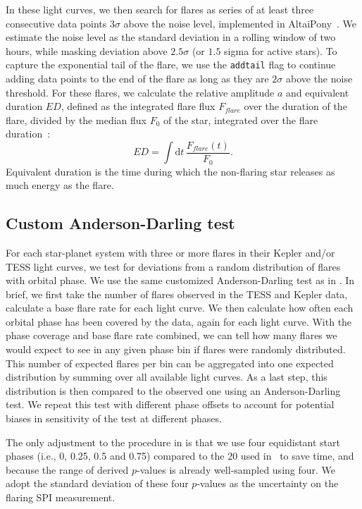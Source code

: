 \documentclass[twocolumn]{aastex631}
\begin{document}
In these light curves, we then search for flares as series of at least three consecutive data points $3\sigma$ above the noise level, implemented in AltaiPony~\cite{ilin2021altaipony}. We estimate the noise
level as the standard deviation in a rolling window of two hours, while masking deviation above $2.5\sigma$ (or $1.5$ sigma for active stars). To capture the exponential tail of the flare, we use the \texttt{addtail} flag to continue adding data points to the end of the flare as long as they are $2\sigma$ above the noise threshold. For these flares, we calculate the relative amplitude $a$ and equivalent duration $ED$, defined as the integrated flare flux $F_{flare}$ over the duration of the flare, divided by the median flux $F_0$ of the star, integrated over the flare duration~\citep{gershberg1972results}:
\begin{equation}
\label{eq:ED}
ED=\displaystyle \int \mathrm dt\, \frac{F_{flare}(t)}{F_0}.
\end{equation}
Equivalent duration is the time during which the non-flaring star releases as much energy as the flare.


\subsection{Custom Anderson-Darling test}
\label{methods:adtest}
For each star-planet system with three or more flares in their Kepler and/or TESS light curves, we test for deviations from a random distribution of flares with orbital phase. We use the same customized Anderson-Darling test as in \cite{ilin2022searching}. In brief, we first take the number of flares observed in the TESS and Kepler data, calculate a base flare rate for each light curve. We then calculate how often each orbital phase has been covered by the data, again for each light curve. With the phase coverage and base flare rate combined, we can tell how many flares we would expect to see in any given phase bin if flares were randomly distributed. This number of expected flares per bin can be aggregated into one expected distribution by summing over all available light curves. As a last step, this distribution is then compared to the observed one using an Anderson-Darling test. We repeat this test with different phase offsets to account for potential biases in sensitivity of the test at different phases.

The only adjustment to the procedure in \cite{ilin2022searching} is that we use four equidistant start phases (i.e., 0, 0.25, 0.5 and 0.75) compared to the 20 used in~\cite{ilin2022searching} to save time, and because the range of derived $p$-values is already well-sampled using four. We adopt the standard deviation of these four $p$-values as the uncertainty on the flaring SPI measurement.
\end{document}
